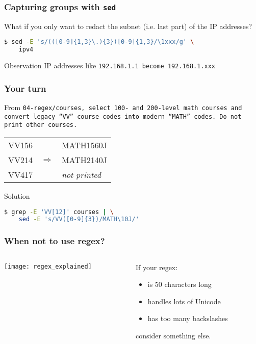 \begin{frame}[fragile]
\frametitle{Capturing groups with \tt{sed}}
What if you only want to redact the subnet (i.e. last part) of the IP addresses?
\begin{lstlisting}[language=bash]
$ sed -E 's/(([0-9]{1,3}\.){3})[0-9]{1,3}/\1xxx/g' \
    ipv4
\end{lstlisting}
\begin{block}{Observation}
    IP addresses like \tt{192.168.1.1} become \tt{192.168.1.xxx}
\end{block}
\end{frame}

\begin{frame}[fragile]
\frametitle{Your turn}
From \tt{04-regex/courses}, select 100- and 200-level math courses and convert
legacy ``VV'' course codes into modern ``MATH'' codes.
Do not print other courses.
\begin{example}
    \begin{tabular}{lcl}
        VV156 & & MATH1560J \\
        VV214 & $\Longrightarrow$ & MATH2140J \\
        VV417 & & \textit{not printed}
    \end{tabular}
\end{example}
\pause
\begin{block}{Solution}
\begin{lstlisting}[language=bash]
$ grep -E 'VV[12]' courses | \
    sed -E 's/VV([0-9]{3})/MATH\10J/'
\end{lstlisting}
\end{block}
\end{frame}

\begin{frame}
\frametitle{When not to use regex?}
\begin{columns}
    \begin{column}{0.7\textwidth}
        \texttt{[image: regex\_explained]}
    \end{column}
    \begin{column}{0.3\textwidth}
        If your regex:
        \begin{itemize}
            \item is 50 characters long
            \item handles lots of Unicode
            \item has too many backslashes
        \end{itemize}
        consider something else.
    \end{column}
\end{columns}
\end{frame}

